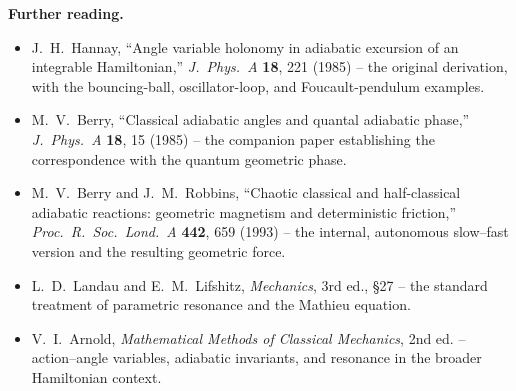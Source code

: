 \documentclass[11pt]{book}
\begin{document}
\bigskip
\noindent\textbf{Further reading.}
\begin{itemize}[leftmargin=1.4em,itemsep=2pt]
\item J.~H.~Hannay, ``Angle variable holonomy in adiabatic excursion of an integrable Hamiltonian,''
\emph{J.\ Phys.\ A} \textbf{18}, 221 (1985) -- the original derivation, with the bouncing-ball,
oscillator-loop, and Foucault-pendulum examples.
\item M.~V.~Berry, ``Classical adiabatic angles and quantal adiabatic phase,'' \emph{J.\ Phys.\ A}
\textbf{18}, 15 (1985) -- the companion paper establishing the correspondence with the quantum
geometric phase.
\item M.~V.~Berry and J.~M.~Robbins, ``Chaotic classical and half-classical adiabatic reactions:
geometric magnetism and deterministic friction,'' \emph{Proc.\ R.\ Soc.\ Lond.\ A} \textbf{442}, 659
(1993) -- the internal, autonomous slow--fast version and the resulting geometric force.
\item L.~D.~Landau and E.~M.~Lifshitz, \emph{Mechanics}, 3rd ed., \S27 -- the standard treatment of
parametric resonance and the Mathieu equation.
\item V.~I.~Arnold, \emph{Mathematical Methods of Classical Mechanics}, 2nd ed. -- action--angle
variables, adiabatic invariants, and resonance in the broader Hamiltonian context.
\end{itemize}

\end{document}
